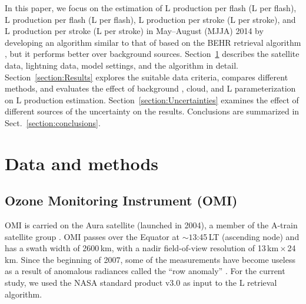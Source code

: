 \documentclass[amt]{copernicus}
\begin{document}
In this paper, we focus on the estimation of L production per flash (L per flash), L production per flash (L per flash), L production per stroke (L per stroke), and L production per stroke (L per stroke) in May--August (MJJA) 2014 by developing an algorithm similar to that of \citet{Pickering.2016} based on the BEHR  retrieval algorithm \citep{Laughner.2018,Laughner.2019}, but it performs better over background  sources.
Section~\ref{section:DataandMethods} describes the satellite data, lightning data, model settings, and the algorithm in detail.
Section~\ref{section:Results} explores the suitable data criteria, compares different methods, and evaluates the effect of background , cloud, and L parameterization on L production estimation.
Section~\ref{section:Uncertainties} examines the effect of different sources of the uncertainty on the results.
Conclusions are summarized in Sect.~\ref{section:conclusions}.

\section{Data and methods} \label{section:DataandMethods}

\subsection{Ozone Monitoring Instrument (OMI)}

OMI is carried on the Aura satellite (launched in 2004), a member of the A-train satellite group \citep{Levelt.2006,Levelt.2018}. OMI passes over the Equator at $\sim 13$:45\,LT (ascending node) and has a swath width of 2600\,km, with a nadir field-of-view resolution of 13\,km\,$\times$\,24\,km.
Since the beginning of 2007, some of the measurements have become useless as a result of anomalous radiances called the ``row anomaly'' \citep{Dobber.2008,KNMI.2020}.
For the current study, we used the NASA standard product v3.0 \citep{Krotkov.2017} as input to the L retrieval algorithm.
\end{document}
